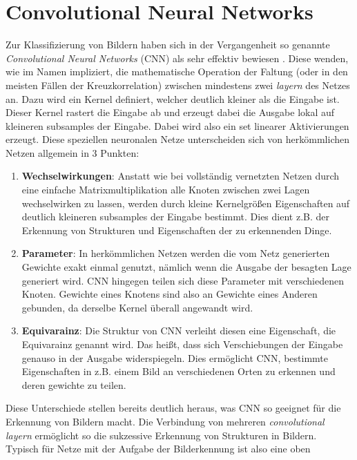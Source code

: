 \chapter{Convolutional Neural Networks}\label{sec:netze}

Zur Klassifizierung von Bildern haben sich in der Vergangenheit so genannte
\textit{Convolutional Neural Networks} (CNN) als sehr effektiv bewiesen \cite{goodfellow}.
Diese wenden, wie im Namen impliziert, die mathematische Operation der Faltung
(oder in den meisten Fällen der Kreuzkorrelation) zwischen mindestens zwei
\textit{layern} des Netzes an.
Dazu wird ein Kernel definiert, welcher deutlich kleiner als die Eingabe ist.
Dieser Kernel rastert die Eingabe ab und erzeugt dabei die Ausgabe lokal auf
kleineren subsamples der Eingabe. Dabei wird also ein set linearer Aktivierungen
erzeugt.
Diese speziellen neuronalen Netze unterscheiden sich von herkömmlichen Netzen
allgemein in 3 Punkten:
%
\begin{enumerate}
  \item \textbf{Wechselwirkungen}: Anstatt wie bei vollständig vernetzten
  Netzen durch eine einfache Matrixmultiplikation alle Knoten zwischen zwei
  Lagen wechselwirken zu lassen, werden durch kleine Kernelgrößen
  Eigenschaften auf deutlich kleineren subsamples der Eingabe bestimmt. Dies dient
  z.B. der Erkennung von Strukturen und Eigenschaften der zu erkennenden Dinge.
  \item \textbf{Parameter}: In herkömmlichen Netzen werden die vom Netz
  generierten Gewichte exakt einmal genutzt, nämlich wenn die Ausgabe der
  besagten Lage generiert wird. CNN hingegen teilen sich diese Parameter mit
  verschiedenen Knoten. Gewichte eines Knotens sind also an Gewichte eines
  Anderen gebunden, da derselbe Kernel überall angewandt wird.
  \item \textbf{Equivarainz}: Die Struktur von CNN verleiht diesen eine
  Eigenschaft, die Equivarainz genannt wird. Das heißt, dass sich
  Verschiebungen der Eingabe genauso in der Ausgabe widerspiegeln. Dies ermöglicht
  CNN, bestimmte Eigenschaften in z.B. einem Bild an verschiedenen Orten zu erkennen
  und deren gewichte zu teilen.
\end{enumerate}
%
Diese Unterschiede stellen bereits deutlich heraus, was CNN so geeignet für die
Erkennung von Bildern macht. Die Verbindung von mehreren \textit{convolutional
layern} ermöglicht so die sukzessive Erkennung von Strukturen in Bildern. \\
Typisch für Netze mit der Aufgabe der Bilderkennung ist also eine oben
